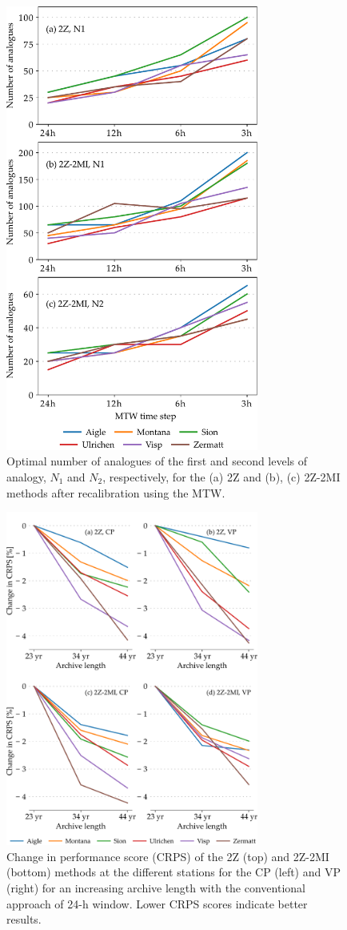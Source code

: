 \documentclass[hess, manuscript]{copernicus}
\begin{document}
	\begin{figure}[htb]
		\includegraphics[width=8.3cm]{fig13.pdf}
		\caption{Optimal number of analogues of the first and second levels of analogy, $N_{1}$ and $N_{2}$, respectively, for the (a) 2Z and (b), (c) 2Z-2MI methods after recalibration using the MTW.}
		\label{fig:analog_nb}
	\end{figure}
	
	\begin{figure}[htb]
		\includegraphics[width=8.3cm]{fig14.pdf}
		\caption{Change in performance score (CRPS) of the 2Z (top)  and 2Z-2MI (bottom) methods at the different stations for the CP (left) and VP (right) for an increasing archive length with the conventional approach of 24-h window. Lower CRPS scores indicate better results.}
		\label{fig:plots_archive_length}
	\end{figure}
	
\end{document}
